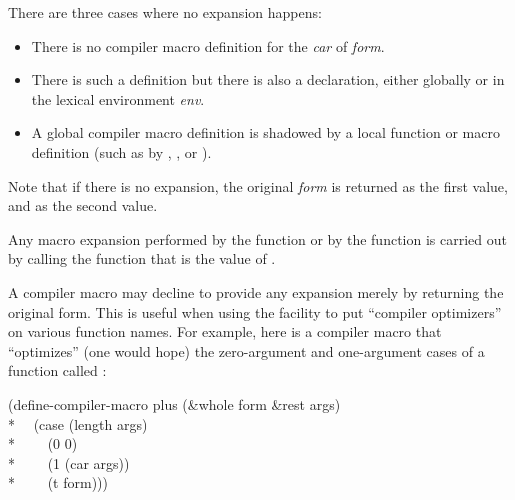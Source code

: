 \begin{newer}
\begin{defun}[Function]
  There are three cases where no expansion happens:
  \begin{itemize}
    \item There is no compiler macro definition for the \emph{car} of \emph{form}.
    \item There is such a definition but there is also a 
        declaration, either globally or in the lexical environment \emph{env}.
    \item A global compiler macro definition is shadowed by a local
        function or macro definition (such as by , , or
        ).
  \end{itemize}
  Note that if there is no expansion, the original \emph{form} is returned as
  the first value, and  as the second value.
  
  Any macro expansion performed by the function 
  or by the function  is carried out
  by calling the function that is the value of .

A compiler macro may decline to provide any expansion merely
by returning the original form. This is useful when using the facility
to put ``compiler optimizers'' on various function names.  For example,
here is a compiler macro that ``optimizes'' (one would hope)
the zero-argument and one-argument cases of
a function called :
\begin{lisp}
(define-compiler-macro plus (\&whole form \&rest args) \\*
~~(case (length args) \\*
~~~~(0 0) \\*
~~~~(1 (car args)) \\*
~~~~(t form)))
\end{lisp}
\end{defun}
\end{newer}


